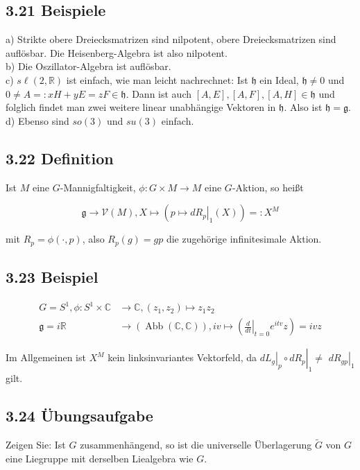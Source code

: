 \documentclass[10pt, letterpaper]{article}
\begin{document}
\subsection*{3.21 Beispiele}
a) Strikte obere Dreiecksmatrizen sind nilpotent, obere Dreiecksmatrizen sind auflösbar. Die Heisenberg-Algebra ist also nilpotent.\\
b) Die Oszillator-Algebra ist auflösbar.\\
c) $s \ell(2, \mathbb{R})$ ist einfach, wie man leicht nachrechnet: Ist $\mathfrak{h}$ ein Ideal, $\mathfrak{h} \neq 0$ und $0 \neq A=: x H+y E=z F \in \mathfrak{h}$. Dann ist auch $[A, E],[A, F],[A, H] \in \mathfrak{h}$ und folglich findet man zwei weitere linear unabhängige Vektoren in $\mathfrak{h}$. Also ist $\mathfrak{h}=\mathfrak{g}$.\\
d) Ebenso sind $s o(3)$ und $s u(3)$ einfach.

\subsection*{3.22 Definition}
Ist $M$ eine $G$-Mannigfaltigkeit, $\phi: G \times M \rightarrow M$ eine $G$-Aktion, so heißt

$$
\mathfrak{g} \rightarrow \mathcal{V}(M), X \mapsto\left(\left.p \mapsto d R_{p}\right|_{1}(X)\right)=: X^{M}
$$

mit $R_{p}=\phi(\cdot, p)$, also $R_{p}(g)=g p$ die zugehörige infinitesimale Aktion.

\subsection*{3.23 Beispiel}
$$
\begin{aligned}
G=S^{1}, \phi: S^{1} \times \mathbb{C} & \rightarrow \mathbb{C},\left(z_{1}, z_{2}\right) \mapsto z_{1} z_{2} \\
\mathfrak{g}=i \mathbb{R} & \rightarrow(\operatorname{Abb}(\mathbb{C}, \mathbb{C})), i v \mapsto\left(\left.\frac{d}{d t}\right|_{t=0} e^{i t v} z\right)=i v z
\end{aligned}
$$

Im Allgemeinen ist $X^{M}$ kein linksinvariantes Vektorfeld, da $\left.\left.d L_{g}\right|_{p} \circ d R_{p}\right|_{1} \neq$ $\left.d R_{g p}\right|_{1}$ gilt.

\subsection*{3.24 Übungsaufgabe}
Zeigen Sie: Ist $G$ zusammenhängend, so ist die universelle Überlagerung $\widetilde{G}$ von $G$ eine Liegruppe mit derselben Liealgebra wie $G$.
\end{document}
